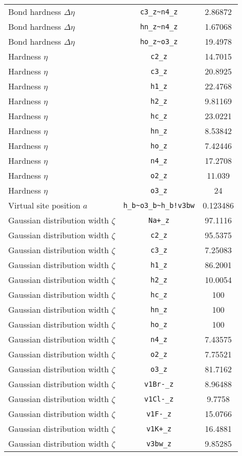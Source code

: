 \begin{table}[ht]
\begin{tabular}{lcc}
Bond hardness $\Delta\eta$ & \verb^c3_z~n4_z^ & 2.86872 \\ 
Bond hardness $\Delta\eta$ & \verb^hn_z~n4_z^ & 1.67068 \\ 
Bond hardness $\Delta\eta$ & \verb^ho_z~o3_z^ & 19.4978 \\ 
Hardness $\eta$ & \verb^c2_z^ & 14.7015 \\ 
Hardness $\eta$ & \verb^c3_z^ & 20.8925 \\ 
Hardness $\eta$ & \verb^h1_z^ & 22.4768 \\ 
Hardness $\eta$ & \verb^h2_z^ & 9.81169 \\ 
Hardness $\eta$ & \verb^hc_z^ & 23.0221 \\ 
Hardness $\eta$ & \verb^hn_z^ & 8.53842 \\ 
Hardness $\eta$ & \verb^ho_z^ & 7.42446 \\ 
Hardness $\eta$ & \verb^n4_z^ & 17.2708 \\ 
Hardness $\eta$ & \verb^o2_z^ & 11.039 \\ 
Hardness $\eta$ & \verb^o3_z^ & 24 \\ 
Virtual site position $a$ & \verb^h_b~o3_b~h_b!v3bw^ & 0.123486 \\ 
Gaussian distribution width $\zeta$ & \verb^Na+_z^ & 97.1116 \\ 
Gaussian distribution width $\zeta$ & \verb^c2_z^ & 95.5375 \\ 
Gaussian distribution width $\zeta$ & \verb^c3_z^ & 7.25083 \\ 
Gaussian distribution width $\zeta$ & \verb^h1_z^ & 86.2001 \\ 
Gaussian distribution width $\zeta$ & \verb^h2_z^ & 10.0054 \\ 
Gaussian distribution width $\zeta$ & \verb^hc_z^ & 100 \\ 
Gaussian distribution width $\zeta$ & \verb^hn_z^ & 100 \\ 
Gaussian distribution width $\zeta$ & \verb^ho_z^ & 100 \\ 
Gaussian distribution width $\zeta$ & \verb^n4_z^ & 7.43575 \\ 
Gaussian distribution width $\zeta$ & \verb^o2_z^ & 7.75521 \\ 
Gaussian distribution width $\zeta$ & \verb^o3_z^ & 81.7162 \\ 
Gaussian distribution width $\zeta$ & \verb^v1Br-_z^ & 8.96488 \\ 
Gaussian distribution width $\zeta$ & \verb^v1Cl-_z^ & 9.7758 \\ 
Gaussian distribution width $\zeta$ & \verb^v1F-_z^ & 15.0766 \\ 
Gaussian distribution width $\zeta$ & \verb^v1K+_z^ & 16.4881 \\ 
Gaussian distribution width $\zeta$ & \verb^v3bw_z^ & 9.85285 \\ 
\hline
\end{tabular}
\end{table}
